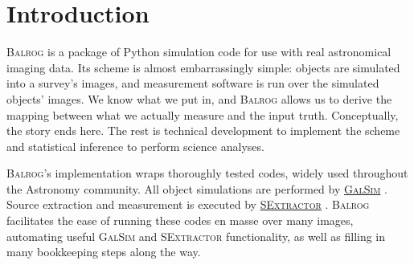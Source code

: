 \documentclass[11pt]{book}
\newcommand{\py}{Python}
\newcommand{\galsim}{\textsc{GalSim}}
\newcommand{\balrog}{\textsc{Balrog}}
\newcommand{\sex}{\textsc{SExtractor}}
\begin{document}
\renewcommand\footnoterule{}
\let\cleardoublepage\clearpage
\balrogtitlepage
\tableofcontents

\chapter{Introduction}
\label{sec:intro}
\setlength{\parskip}{0pt}
\renewcommand\footnoterule{\kern-3pt \hrule width 2in \kern 2.6pt}


\balrog{} is a package of \py{} simulation code for use with real astronomical imaging data.
Its scheme is almost embarrassingly simple: objects are simulated into a survey's images,
and measurement software is run over the simulated objects' images.
We know what we put in, and \balrog{} allows us to derive the mapping between what we actually measure and the input truth.
Conceptually, the story ends here.
The rest is technical development to implement the scheme and statistical inference to perform science analyses.


%

\balrog{}'s implementation wraps thoroughly tested codes, widely used throughout the Astronomy community.
All object simulations are performed by \href{https://github.com/GalSim-developers/GalSim}{\galsim{}} \citep{galsim}.
Source extraction and measurement is executed by \href{https://www.astromatic.net/software/sextractor}{\sex{}} \citep{sextractor}.
\balrog{} facilitates the ease of running these codes en masse over many images, 
automating useful \galsim{} and \sex{} functionality, as well as filling in many bookkeeping steps along the way.
\end{document}
